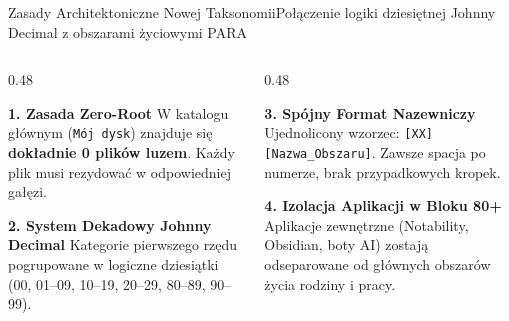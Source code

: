 \documentclass[aspectratio=169, 10pt]{beamer}
\begin{document}

\begin{frame}{Zasady Architektoniczne Nowej Taksonomii}{Połączenie logiki dziesiętnej Johnny Decimal z obszarami życiowymi PARA}
  \begin{columns}[T]
    \begin{column}{0.48\textwidth}
      \begin{block}{\textbf{1. Zasada Zero-Root}}
        W katalogu głównym (\texttt{Mój dysk}) znajduje się \textbf{dokładnie 0 plików luzem}. Każdy plik musi rezydować w odpowiedniej gałęzi.
      \end{block}

      \vspace{0.2cm}
      \begin{block}{\textbf{2. System Dekadowy Johnny Decimal}}
        Kategorie pierwszego rzędu pogrupowane w logiczne dziesiątki (00, 01--09, 10--19, 20--29, 80--89, 90--99).
      \end{block}
    \end{column}

    \begin{column}{0.48\textwidth}
      \begin{block}{\textbf{3. Spójny Format Nazewniczy}}
        Ujednolicony wzorzec: \texttt{[XX] [Nazwa\_Obszaru]}. Zawsze spacja po numerze, brak przypadkowych kropek.
      \end{block}

      \vspace{0.2cm}
      \begin{block}{\textbf{4. Izolacja Aplikacji w Bloku 80+}}
        Aplikacje zewnętrzne (Notability, Obsidian, boty AI) zostają odseparowane od głównych obszarów życia rodziny i pracy.
      \end{block}
    \end{column}
  \end{columns}
\end{frame}
\end{document}
